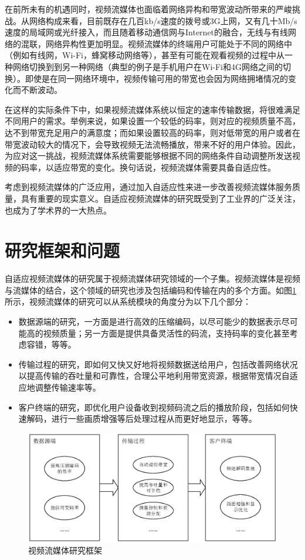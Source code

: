 在前所未有的机遇同时，视频流媒体也面临着网络异构和带宽波动所带来的严峻挑战。从网络构成来看，目前既存在几百kb/s速度的拨号或3G上网，又有几十Mb/s速度的局域网或光纤接入，而且随着移动通信网与Internet的融合，无线与有线网络的混联，网络异构性更加明显。视频流媒体的终端用户可能处于不同的网络中（例如有线网，Wi-Fi，蜂窝移动网络等），甚至有可能在观看视频的过程中从一种网络切换到到另一种网络（典型的例子是手机用户在Wi-Fi和4G网络之间的切换）。即使是在同一网络环境中，视频传输可用的带宽也会因为网络拥堵情况的变化而不断波动。

在这样的实际条件下中，如果视频流媒体系统以恒定的速率传输数据，将很难满足不同用户的需求。举例来说，如果设置一个较低的码率，则对应的视频质量不高，达不到带宽充足用户的满意度；而如果设置较高的码率，则对低带宽的用户或者在带宽波动较大的情况下，会导致视频无法流畅播放，带来不好的用户体验。因此，为应对这一挑战，视频流媒体系统需要能够根据不同的网络条件自动调整所发送视频的码率，以适应带宽的变化。换句话说，视频流媒体需要具备自适应性。

考虑到视频流媒体的广泛应用，通过加入自适应性来进一步改善视频流媒体服务质量，具有重要的现实意义。自适应视频流媒体的研究既受到了工业界的广泛关注，也成为了学术界的一大热点。

\section{研究框架和问题}

自适应视频流媒体的研究属于视频流媒体研究领域的一个子集。视频流媒体是视频与流媒体的结合，这个领域的研究也涉及包括编码和传输在内的多个方面。如图\ref{fig:research-framework}所示，视频流媒体的研究可以从系统模块的角度分为以下几个部分：

\begin{itemize}
	\item 数据源端的研究，一方面是进行高效的压缩编码，以尽可能少的数据表示尽可能高的视频质量；另一方面是提供具备灵活性的码流，支持码率的变化甚至考虑容错，等等。
	\item 传输过程的研究，即如何又快又好地将视频数据送给用户，包括改善网络状况以提高传输的吞吐量和可靠性，合理公平地利用带宽资源，根据带宽情况自适应地调整传输速率等。
	\item 客户终端的研究，即优化用户设备收到视频码流之后的播放阶段，包括如何快速解码，进行一些画质增强等后处理过程从而更好地显示，等等。
\end{itemize}

\begin{figure}[h]
	\centering
	\includegraphics[width = 1.0\linewidth]{eps/research-framework}
	\caption{视频流媒体研究框架 \label{fig:research-framework}}
\end{figure}

